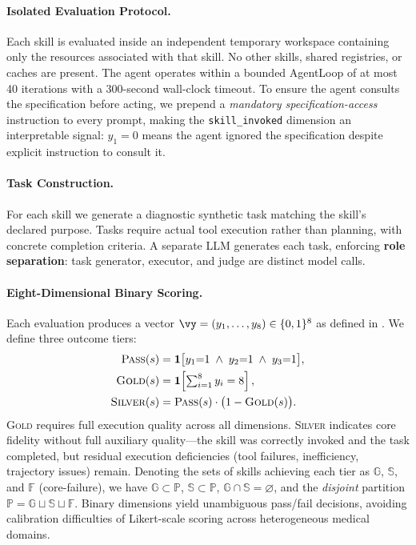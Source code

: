 \paragraph{Isolated Evaluation Protocol.}
Each skill is evaluated inside an independent temporary workspace containing only the resources associated with that skill.
No other skills, shared registries, or caches are present.
The agent operates within a bounded AgentLoop of at most 40 iterations with a 300-second wall-clock timeout.
To ensure the agent consults the specification before acting, we prepend a \emph{mandatory specification-access} instruction to every prompt, making the \texttt{skill\_invoked} dimension an interpretable signal: $y_1=0$ means the agent ignored the specification despite explicit instruction to consult it.

\paragraph{Task Construction.}
For each skill we generate a diagnostic synthetic task matching the skill's declared purpose.
Tasks require actual tool execution rather than planning, with concrete completion criteria.
A separate LLM generates each task, enforcing \textbf{role separation}: task generator, executor, and judge are distinct model calls.

\paragraph{Eight-Dimensional Binary Scoring.}
Each evaluation produces a vector $\vy = (y_1, \ldots, y_8) \in \{0,1\}^8$ as defined in .
We define three outcome tiers:
\begin{align}
    \textsc{Pass}(s) &= \mathbf{1}\bigl[y_1{=}1 \;\wedge\; y_2{=}1 \;\wedge\; y_3{=}1\bigr], \label{eq:pass} \\
    \textsc{Gold}(s) &= \mathbf{1}\!\left[\textstyle\sum_{i=1}^{8} y_i = 8\right], \label{eq:gold} \\
    \textsc{Silver}(s) &= \textsc{Pass}(s) \cdot \bigl(1 - \textsc{Gold}(s)\bigr). \label{eq:silver}
\end{align}
\textsc{Gold} requires full execution quality across all dimensions.
\textsc{Silver} indicates core fidelity without full auxiliary quality---the skill was correctly invoked and the task completed, but residual execution deficiencies (tool failures, inefficiency, trajectory issues) remain.
Denoting the sets of skills achieving each tier as $\mathbb{G}$, $\mathbb{S}$, and $\mathbb{F}$ (core-failure), we have $\mathbb{G} \subset \mathbb{P}$, $\mathbb{S} \subset \mathbb{P}$, $\mathbb{G} \cap \mathbb{S} = \varnothing$, and the \emph{disjoint} partition $\mathbb{P} = \mathbb{G} \sqcup \mathbb{S} \sqcup \mathbb{F}$.
Binary dimensions yield unambiguous pass/fail decisions, avoiding calibration difficulties of Likert-scale scoring across heterogeneous medical domains.

